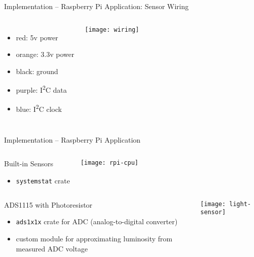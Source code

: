 \begin{frame}{Implementation -- Raspberry Pi Application: Sensor Wiring}
  \begin{columns}

    \begin{itemize}
      \item {\color{red}red:} 5v power
      \item {\color{orange}orange:} 3.3v power
      \item {\color{black}black:} ground
      \item {\color{purple}purple:} I\textsuperscript{2}C data
      \item {\color{blue}blue:} I\textsuperscript{2}C clock
    \end{itemize}

    \vspace*{1em}
    \texttt{[image: wiring]}
  \end{columns}
\end{frame}

\begin{frame}{Implementation -- Raspberry Pi Application}
  \begin{columns}
    \begin{block}{Built-in Sensors}
      \begin{itemize}
        \item \texttt{systemstat} crate
      \end{itemize}
    \end{block}

    \vfill
    \centering
    \texttt{[image: rpi-cpu]}
  \end{columns}

  \begin{columns}
    \begin{block}{ADS1115 with Photoresistor}
      \begin{itemize}
        \item \texttt{ads1x1x} crate for ADC (analog-to-digital converter)
        \item custom module for approximating luminosity from measured ADC voltage
      \end{itemize}
    \end{block}

    \vfill
    \centering
    \texttt{[image: light-sensor]}
  \end{columns}
\end{frame}

